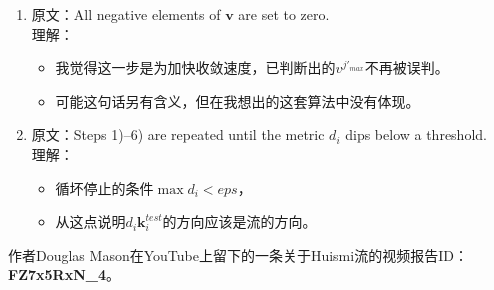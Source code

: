 \documentclass[UTF8]{ctexart}
\begin{document}
\begin{enumerate}
        {\heiti 理解}：
        \begin{itemize}
            \item 当找出与$\mathbf{u}_{i}^{j'}$相匹配的$\mathbf{v}^{j}$后，应减去它们之间相同的部分，防止在下次迭代计算中误判。
            \item 计算操作可表达为$\mathbf{v'}^{j_{max}}=\mathbf{v}^{j_{max}}-\mathbf{u}_{i}^{j'_{max}}\frac{d_{i}^{j_{max},j'_{max}}}{\mathbf{u}_{i}^{j'_{max}}\cdot\mathbf{u}_{i}^{j'_{max}}}$
        \end{itemize}
\item {\heiti 原文}：All negative elements of $\mathbf{v}$ are set to zero.\\
        {\heiti 理解}：
        \begin{itemize}
            \item 我觉得这一步是为加快收敛速度，已判断出的$v^{j'_{max}}$不再被误判。
            \item 可能这句话另有含义，但在我想出的这套算法中没有体现。
        \end{itemize}
\item {\heiti 原文}：Steps 1)–6) are repeated until the metric $d_i$ dips
        below a threshold.\\
        {\heiti 理解}：
        \begin{itemize}
            \item 循坏停止的条件$\max{d_i}<eps$，
            \item 从这点说明$d_i\mathbf{k}_{i}^{test}$的方向应该是流的方向。
        \end{itemize}
\end{enumerate}
%
作者Douglas Mason在YouTube上留下的一条关于Huismi流的视频报告ID：\textbf{FZ7x5RxN\_4}。
\end{document}
